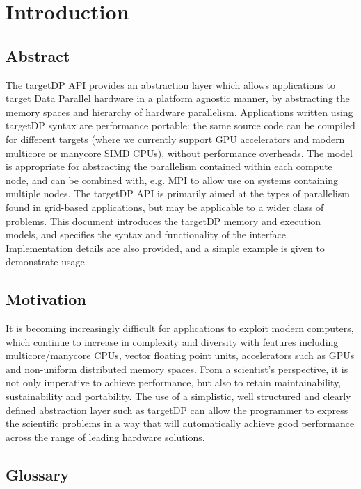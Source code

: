
\chapter{Introduction}

\section{Abstract}

The targetDP API provides an abstraction layer which allows
applications to \underline{t}arget \underline{D}ata
\underline{P}arallel hardware in a platform agnostic manner, by
abstracting the memory spaces and hierarchy of hardware
parallelism. Applications written using targetDP syntax are
performance portable: the same source code can be compiled for
different targets (where we currently support GPU accelerators and
modern multicore or manycore SIMD CPUs), without performance
overheads. The model is appropriate for abstracting the parallelism
contained within each compute node, and can be combined with, e.g. MPI
to allow use on systems containing multiple nodes. The targetDP API is
primarily aimed at the types of parallelism found in grid-based
applications, but may be applicable to a wider class of problems.
This document introduces the targetDP memory and execution models, and
specifies the syntax and functionality of the
interface. Implementation details are also provided, and a simple
example is given to demonstrate usage.

\section{Motivation}
It is becoming increasingly difficult for applications to exploit
modern computers, which continue to increase in complexity and
diversity with features including multicore/manycore CPUs, vector
floating point units, accelerators such as GPUs and non-uniform
distributed memory spaces.  From a scientist's perspective, it is not
only imperative to achieve performance, but also to retain
maintainability, sustainability and portability. The use of a
simplistic, well structured and clearly defined abstraction layer such
as targetDP can allow the programmer to express the scientific
problems in a way that will automatically achieve good performance
across the range of leading hardware solutions.

\section{Glossary}

